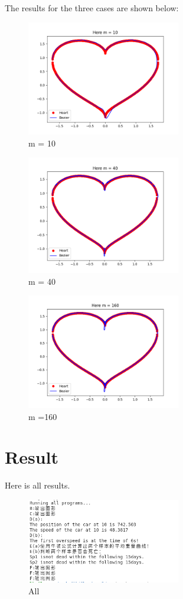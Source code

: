 \documentclass[a4paper]{article}
\begin{document}
 The results for the three cases are shown below:
 \begin{figure}[htbp]
  \centering
  \includegraphics[width=0.6\textwidth]{F1.png}
  \caption{m = 10}
\end{figure}
\begin{figure}[htbp]
  \centering
  \includegraphics[width=0.6\textwidth]{F2.png}
  \caption{m = 40}
\end{figure}
\begin{figure}[htbp]
  \centering
  \includegraphics[width=0.6\textwidth]{F3.png}
  \caption{m =160}
\end{figure}

\section*{Result}
Here is all results.
\begin{figure}[htbp]
  \centering
  \includegraphics[width=0.6\textwidth]{result.png}
  \caption{All}
\end{figure}
\end{document}
